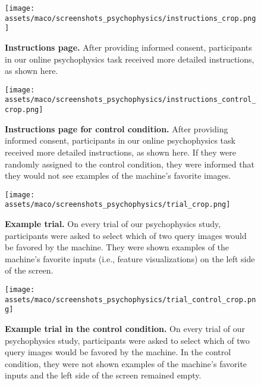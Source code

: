 \begin{figure}[ht]
    \centering
    \texttt{[image: assets/maco/screenshots\_psychophysics/instructions\_crop.png]}
    \caption{\textbf{Instructions page.} After providing informed consent, participants in our online psychophysics task received more detailed instructions, as shown here.}
    \label{fig:psychophysics-instructions}
\end{figure}

\begin{figure}[ht]
    \centering
    \texttt{[image: assets/maco/screenshots\_psychophysics/instructions\_control\_crop.png]}
    \caption{\textbf{Instructions page for control condition.} After providing informed consent, participants in our online psychophysics task received more detailed instructions, as shown here. If they were randomly assigned to the control condition, they were informed that they would not see examples of the machine's favorite images. }
    \label{fig:psychophysics-instructions-control}
\end{figure}


\begin{figure}[ht]
    \centering
    \texttt{[image: assets/maco/screenshots\_psychophysics/trial\_crop.png]}
    \caption{\textbf{Example trial.} On every trial of our psychophysics study, participants were asked to select which of two query images would be favored by the machine. They were shown examples of the machine's favorite inputs (i.e., feature visualizations) on the left side of the screen.}
    \label{fig:psychophysics-trial}
\end{figure}


\begin{figure}[ht]
    \centering
    \texttt{[image: assets/maco/screenshots\_psychophysics/trial\_control\_crop.png]}
    \caption{\textbf{Example trial in the control condition.} On every trial of our psychophysics study, participants were asked to select which of two query images would be favored by the machine. In the control condition, they were not shown examples of the machine's favorite inputs and the left side of the screen remained empty.}
    \label{fig:psychophysics-trial-control}
\end{figure}
